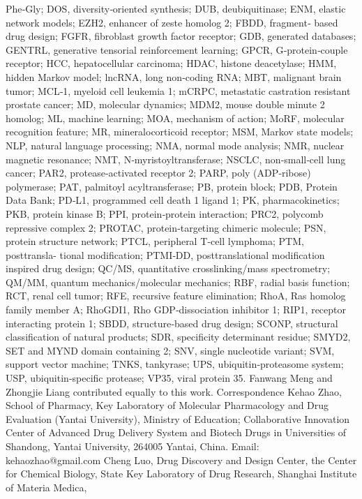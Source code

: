 Phe‐Gly; DOS, diversity‐oriented synthesis; DUB, deubiquitinase; ENM, elastic network models; EZH2, enhancer of zeste homolog 2; FBDD, fragment‐
based drug design; FGFR, fibroblast growth factor receptor; GDB, generated databases; GENTRL, generative tensorial reinforcement learning; GPCR,
G‐protein‐couple receptor; HCC, hepatocellular carcinoma; HDAC, histone deacetylase; HMM, hidden Markov model; lncRNA, long non‐coding RNA; MBT,
malignant brain tumor; MCL‐1, myeloid cell leukemia 1; mCRPC, metastatic castration resistant prostate cancer; MD, molecular dynamics; MDM2, mouse
double minute 2 homolog; ML, machine learning; MOA, mechanism of action; MoRF, molecular recognition feature; MR, mineralocorticoid receptor; MSM,
Markov state models; NLP, natural language processing; NMA, normal mode analysis; NMR, nuclear magnetic resonance; NMT, N‐myristoyltransferase; NSCLC,
non‐small‐cell lung cancer; PAR2, protease‐activated receptor 2; PARP, poly (ADP‐ribose) polymerase; PAT, palmitoyl acyltransferase; PB, protein block; PDB,
Protein Data Bank; PD‐L1, programmed cell death 1 ligand 1; PK, pharmacokinetics; PKB, protein kinase B; PPI, protein‐protein interaction; PRC2, polycomb
repressive complex 2; PROTAC, protein‐targeting chimeric molecule; PSN, protein structure network; PTCL, peripheral T‐cell lymphoma; PTM, posttransla-
tional modification; PTMI‐DD, posttranslational modification inspired drug design; QC/MS, quantitative crosslinking/mass spectrometry; QM/MM, quantum
mechanics/molecular mechanics; RBF, radial basis function; RCT, renal cell tumor; RFE, recursive feature elimination; RhoA, Ras homolog family member A;
RhoGDI1, Rho GDP‐dissociation inhibitor 1; RIP1, receptor interacting protein 1; SBDD, structure‐based drug design; SCONP, structural classification of
natural products; SDR, specificity determinant residue; SMYD2, SET and MYND domain containing 2; SNV, single nucleotide variant; SVM, support vector
machine; TNKS, tankyrase; UPS, ubiquitin‐proteasome system; USP, ubiquitin‐specific protease; VP35, viral protein 35.
Fanwang Meng and Zhongjie Liang contributed equally to this work.
Correspondence
Kehao Zhao, School of Pharmacy, Key
Laboratory of Molecular Pharmacology and
Drug Evaluation (Yantai University), Ministry
of Education; Collaborative Innovation
Center of Advanced Drug Delivery System
and Biotech Drugs in Universities of
Shandong, Yantai University, 264005 Yantai,
China.
Email: kehaozhao@gmail.com
Cheng Luo, Drug Discovery and Design
Center, the Center for Chemical Biology,
State Key Laboratory of Drug Research,
Shanghai Institute of Materia Medica,
